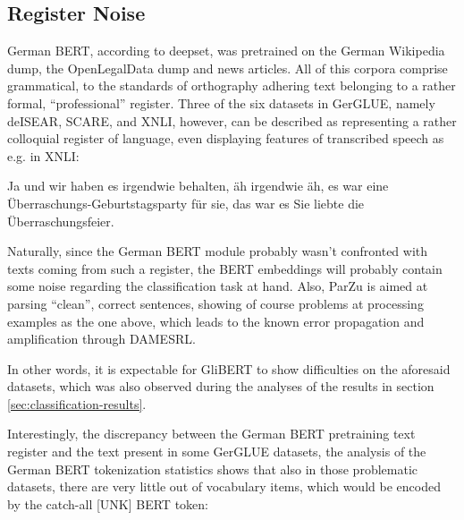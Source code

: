 \subsection{Register Noise}
\label{sec:register-noise}

German BERT, according to deepset, was pretrained on the German Wikipedia dump, the OpenLegalData dump and
news articles. All of this corpora comprise grammatical, to the standards of orthography adhering text
belonging to a rather formal, ``professional'' register. Three of the six datasets in GerGLUE, namely
deISEAR, SCARE, and XNLI, however, can be described as representing a rather colloquial register of
language, even displaying features of transcribed speech as e.g. in XNLI:

\begin{examples}
  \item Ja und wir haben es irgendwie behalten, äh irgendwie äh, es war eine Überraschungs-Geburtstagsparty für sie, das war es Sie liebte die Überraschungsfeier.
\end{examples}

Naturally, since the German BERT module probably wasn't confronted with texts coming from such a register,
the BERT embeddings will probably contain some noise regarding the classification task at hand. Also, ParZu
is aimed at parsing ``clean'', correct sentences, showing of course problems at processing examples as the
one above, which leads to the known error propagation and amplification through DAMESRL.

In other words, it is expectable for GliBERT to show difficulties on the aforesaid datasets, which
was also observed during the analyses of the results in section \ref{sec:classification-results}.

Interestingly, the discrepancy between the German BERT pretraining text register and the text
present in some GerGLUE datasets, the analysis of the German BERT tokenization statistics shows
that also in those problematic datasets, there are very little out of vocabulary items, which
would be encoded by the catch-all [UNK] BERT token:

